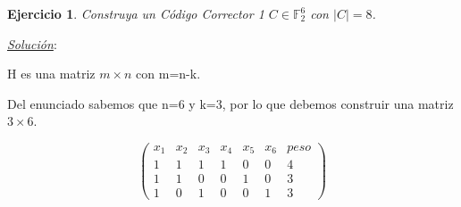 \documentclass{beamer}
\theoremstyle{plain}
\theoremstyle{example}
\newtheorem{ejercicio} [Ejercicio]{Ejercicio}
\theoremstyle{example}
\begin{document}

\begin{frame}  \small \begin{ejercicio} 
Construya un Código Corrector 1  $C \in \mathbb{F}_2^6$  con $|C| = 8$.

\end{ejercicio} %
\textit{\underline{Solución}}:\\ 
\vspace{0.3cm}

H es una matriz $m \times n$ con m=n-k.

Del enunciado sabemos que n=6 y k=3, por lo que debemos construir una matriz $3 \times 6$.

\[
        \left( \begin{array}{ccccccc}
                  x_1 & x_2 & x_3 & x_4 & x_5 & x_6  & peso\\
                      1 &   1   &   1  &    1 &   0  &   0    &4\\  
					  1 &   1   &   0  &    0 &   1  &   0	  &3\\ 
					  1 &   0   &   1  &    0 &   0  &   1	  &3
           			\end{array}
    		\right) 	    		
\]

\end{frame} 




\end{document}
